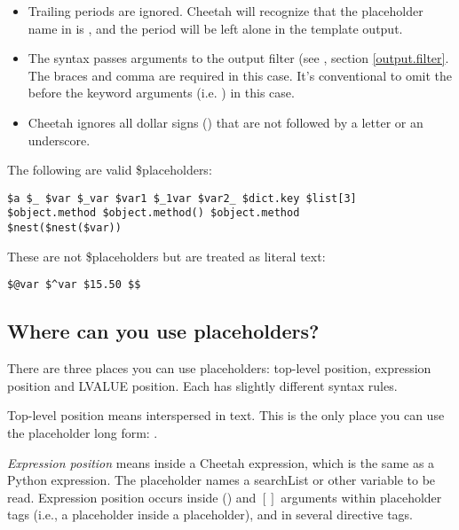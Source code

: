 \begin{itemize}
\item Trailing periods are ignored.  Cheetah will recognize that the placeholder
     name in  is , and the period will be left
     alone in the template output.
     
\item The syntax  passes arguments to
     the output filter (see , section \ref{output.filter}.
     The braces and comma are required in this case.  It's conventional to 
     omit the \code{\$} before the keyword arguments (i.e. ) in this
     case.

\item Cheetah ignores all dollar signs (\code{\$}) that are not followed by a
     letter or an underscore.
     
\end{itemize} 

The following are valid \$placeholders:
\begin{verbatim}
$a $_ $var $_var $var1 $_1var $var2_ $dict.key $list[3]
$object.method $object.method() $object.method
$nest($nest($var))
\end{verbatim}

These are not \$placeholders but are treated as literal text:
\begin{verbatim}
$@var $^var $15.50 $$
\end{verbatim}


\subsection{Where can you use placeholders?}
\label{language.placeholders.positions}

There are three places you can use placeholders: top-level position, 
expression position and LVALUE position.  Each has slightly different
syntax rules.

Top-level position means interspersed in text.  This is the only place
you can use the placeholder long form: .

{\em Expression position} means inside a Cheetah expression, which is the same
as a Python expression.  The placeholder names a searchList or other variable
to be read.  Expression position occurs inside () and $[]$ arguments within
placeholder tags (i.e., a placeholder inside a placeholder), and in several
directive tags.

